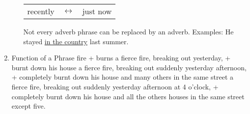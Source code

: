 \begin{enumerate}
\begin{enumerate}
{\begin{tabular}{lll}
                        recently
                        & $\leftrightarrow$ &
                        just now
                    \end{tabular}
                }
                \newline
                \newline
                Not every adverb phrase can be replaced by an adverb.
                \newline
                Examples: He stayed \underline{in the country} last summer.
        \end{enumerate}
    \item Function of a Phrase
        \newline
        \newline
        fire + burns
        \newline
        \newline
        a fierce fire, breaking out yesterday, + burnt down his house
        \newline
        \newline
        a fierce fire, breaking out suddenly yesterday afternoon, +
        completely burnt down his house and many others in the same street
        \newline
        \newline
        a fierce fire, breaking out suddenly yesterday afternoon at 4
        o'clock, + completely burnt down his house and all the others houses
        in the same street except five.
\end{enumerate}
